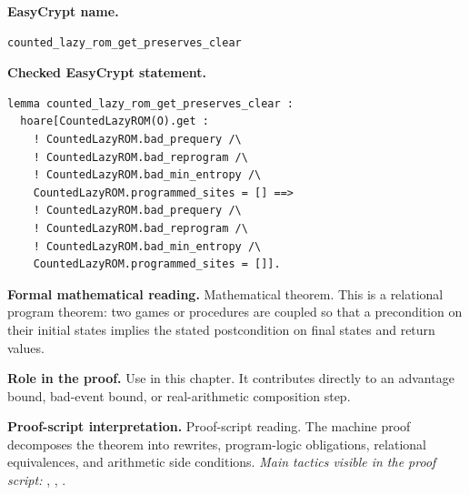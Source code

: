 \begin{formaltheorem}
\noindent\textbf{EasyCrypt name.}
\begin{lstlisting}[language=EasyCrypt,basicstyle=\ttfamily\scriptsize]
counted_lazy_rom_get_preserves_clear
\end{lstlisting}
\noindent\textbf{Checked EasyCrypt statement.}
\begin{lstlisting}[language=EasyCrypt,basicstyle=\ttfamily\scriptsize]
lemma counted_lazy_rom_get_preserves_clear :
  hoare[CountedLazyROM(O).get :
    ! CountedLazyROM.bad_prequery /\
    ! CountedLazyROM.bad_reprogram /\
    ! CountedLazyROM.bad_min_entropy /\
    CountedLazyROM.programmed_sites = [] ==>
    ! CountedLazyROM.bad_prequery /\
    ! CountedLazyROM.bad_reprogram /\
    ! CountedLazyROM.bad_min_entropy /\
    CountedLazyROM.programmed_sites = []].
\end{lstlisting}
\noindent\textbf{Formal mathematical reading.}
Mathematical theorem. This is a relational program theorem: two games or procedures are coupled so that a precondition on their initial states implies the stated postcondition on final states and return values.

\noindent\textbf{Role in the proof.}
Use in this chapter. It contributes directly to an advantage bound, bad-event bound, or real-arithmetic composition step.

\noindent\textbf{Proof-script interpretation.}
Proof-script reading. The machine proof decomposes the theorem into rewrites, program-logic obligations, relational equivalences, and arithmetic side conditions.
\emph{Main tactics visible in the proof script:} , , .

\end{formaltheorem}

